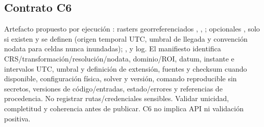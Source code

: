 \documentclass[11pt,a4paper]{article}
\begin{document}
\begin{center}
\end{center}

\subsection{Contrato C6}
Artefacto propuesto por ejecución : rasters georreferenciados , , ; opcionales ,  solo si existen y se definen (origen temporal UTC, umbral de llegada y convención nodata para celdas nunca inundadas); ,  y log. El manifiesto identifica CRS/transformación/resolución/nodata, dominio/ROI, datum, instante e intervalos UTC, umbral y definición de extensión, fuentes y checksum cuando disponible, configuración física, solver y versión, comando reproducible sin secretos, versiones de código/entradas, estado/errores y referencias de procedencia. No registrar rutas/credenciales sensibles. Validar unicidad, completitud y coherencia antes de publicar. C6 no implica API ni validación positiva.
\end{document}

